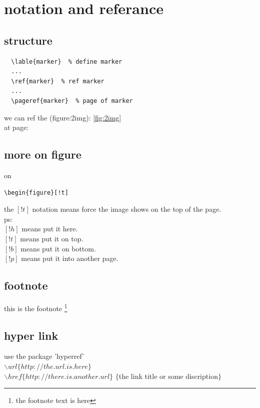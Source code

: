 \documentclass[11pt,a4paper]{article}
\begin{document}
\section{notation and referance}{
  \subsection{structure}{
    {
\begin{verbatim}
  \lable{marker}  % define marker
  ...
  \ref{marker}  % ref marker
  ...
  \pageref{marker}  % page of marker
\end{verbatim}
    }
    we can ref the (figure:2img): \ref{fig:2img} \\
    at page: \pageref{fig:2img}
  }

  \subsection{more on figure}{
    on\begin{verbatim}\begin{figure}[!t]\end{verbatim}
    the $[!t]$ notation means force the image shows on the top of the page. \\
    ps: \\
    $[!h]$ means put it here. \\
    $[!t]$ means put it on top. \\
    $[!b]$ means put it on bottom. \\
    $[!p]$ means put it into another page. \\
  }

  \subsection{footnote}{
    this is the footnote \footnote{the footnote text is here}
  }
  \subsection{hyper link}{
    use the package 'hyperref' \\
    $\backslash url\{http://the.url.is.here\}$ \\
    $\backslash href\{http://there.is.another.url\}$
    $\{$the link title or some discription$\}$
  }
}
  
\end{document}
